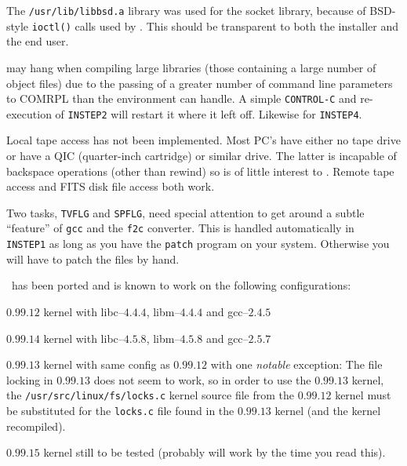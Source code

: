 \begin{description}

\bulitem The {\tt /usr/lib/libbsd.a} library was used for the socket
      library, because of BSD-style {\tt ioctl()} calls used by \AIPS.
      This should be transparent to both the installer and the end user.

 may hang when compiling large libraries (those
      containing a large number of object files) due to the passing of
      a greater number of command line parameters to COMRPL than the
      environment can handle. A simple {\tt CONTROL-C} and
      re-execution of {\tt INSTEP2} will restart it where it left off.
      Likewise for {\tt INSTEP4}.

\bulitem Local tape access has not been implemented.  Most PC's have
      either no tape drive or have a QIC (quarter-inch cartridge) or
      similar drive.  The latter is incapable of backspace operations
      (other than rewind) so is of little interest to \AIPS.  Remote
      tape access and FITS disk file access both work.

\bulitem Two tasks, {\tt TVFLG} and {\tt SPFLG}, need special
      attention to get around a subtle ``feature'' of {\tt gcc} and
      the {\tt f2c} converter.  This is handled automatically in {\tt
      INSTEP1} as long as you have the {\tt patch} program on your
      system.  Otherwise you will have to patch the files by hand.

\end{description}

\AIPS\ has been ported and is known to work on the following
configurations:
\begin{description}

\bulitem $0.99.12$ kernel with libc--$4.4.4$, libm--$4.4.4$ and
        gcc--$2.4.5$

\bulitem $0.99.14$ kernel with libc--$4.5.8$, libm--$4.5.8$ and
        gcc--$2.5.7$

\bulitem $0.99.13$ kernel with same config as $0.99.12$ with one {\it
 	notable\/} exception:
	The file locking in $0.99.13$ does not seem to work, so in order
	to use the $0.99.13$ kernel, the {\tt /usr/src/linux/fs/locks.c}
	kernel source file from the $0.99.12$ kernel must be substituted
	for the {\tt locks.c} file found in the $0.99.13$ kernel (and
	the kernel recompiled).

\bulitem $0.99.15$ kernel still to be tested (probably will work by
        the time you read this).
\end{description}

